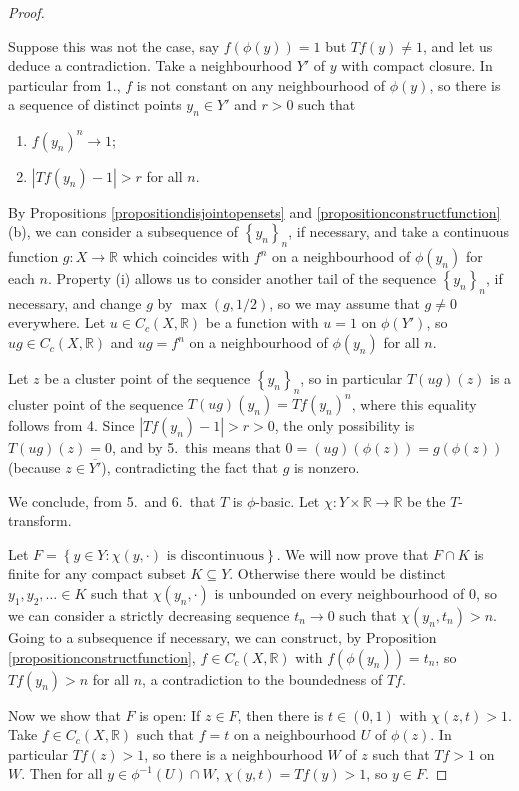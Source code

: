 \begin{proof}
\begin{enumerate}
Suppose this was not the case, say $f(\phi(y))=1$ but $Tf(y)\neq 1$, and let us deduce a contradiction. Take a neighbourhood $Y'$ of $y$ with compact closure. In particular from 1., $f$ is not constant on any neighbourhood of $\phi(y)$, so there is a sequence of distinct points $y_n\in Y'$ and $r>0$ such that
\begin{enumerate}
\item[(i)] $f(y_n)^n\to 1$;
\item[(ii)] $|Tf(y_n)-1|>r$ for all $n$.
\end{enumerate}
By Propositions \ref{propositiondisjointopensets} and \ref{propositionconstructfunction}(b), we can consider a subsequence of $\left\{y_n\right\}_n$, if necessary, and take a continuous function $g:X\to\mathbb{R}$ which coincides with $f^n$ on a neighbourhood of $\phi(y_n)$ for each $n$. Property (i) allows us to consider another tail of the sequence $\left\{y_n\right\}_n$, if necessary, and change $g$ by $\max(g,1/2)$, so we may assume that $g\neq 0$ everywhere. Let $u\in C_c(X,\mathbb{R})$ be a function with $u=1$ on $\phi(Y')$, so $ug\in C_c(X,\mathbb{R})$ and $ug=f^n$ on a neighbourhood of $\phi(y_n)$ for all $n$.

Let $z$ be a cluster point of the sequence $\left\{y_n\right\}_n$, so in particular $T(ug)(z)$ is a cluster point of the sequence $T(ug)(y_n)=Tf(y_n)^n$, where this equality follows from 4. Since $|Tf(y_n)-1|>r>0$, the only possibility is $T(ug)(z)=0$, and by 5.\ this means that $0=(ug)(\phi(z))=g(\phi(z))$ (because $z\in\overline{Y'}$), contradicting the fact that $g$ is nonzero.
\end{enumerate}

We conclude, from 5.\ and 6.\, that $T$ is $\phi$-basic. Let $\chi:Y\times\mathbb{R}\to\mathbb{R}$ be the $T$-transform.

Let $F=\left\{y\in Y:\chi(y,\cdot)\text{ is discontinuous}\right\}$. We will now prove that $F\cap K$ is finite for any compact subset $K\subseteq Y$. Otherwise there would be distinct $y_1,y_2,\ldots\in K$ such that $\chi(y_n,\cdot)$ is unbounded on every neighbourhood of $0$, so we can consider a strictly decreasing sequence $t_n\to 0$ such that $\chi(y_n,t_n)>n$. Going to a subsequence if necessary, we can construct, by Proposition \ref{propositionconstructfunction}, $f\in C_c(X,\mathbb{R})$ with $f(\phi(y_n))=t_n$, so $Tf(y_n)>n$ for all $n$, a contradiction to the boundedness of $Tf$.

Now we show that $F$ is open: If $z\in F$, then there is $t\in(0,1)$ with $\chi(z,t)>1$. Take $f\in C_c(X,\mathbb{R})$ such that $f=t$ on a neighbourhood $U$ of $\phi(z)$. In particular $Tf(z)>1$, so there is a neighbourhood $W$ of $z$ such that $Tf>1$ on $W$. Then for all $y\in\phi^{-1}(U)\cap W$, $\chi(y,t)=Tf(y)>1$, so $y\in F$.


\end{proof}
